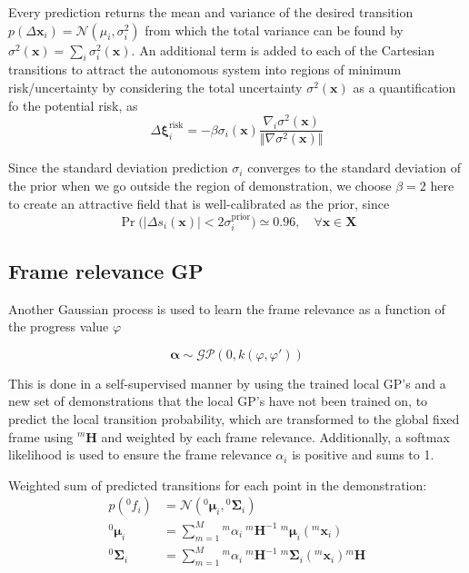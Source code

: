 Every prediction returns the mean and variance of the desired transition \( p(\Delta \boldsymbol{x}_i) = \mathcal{N}(\mu_i, \sigma_i^2) \) from which the total variance can be found by \( \sigma^2(\boldsymbol{x}) = \sum_{i} \sigma_i^2(\boldsymbol{x}) \).
An additional term is added to each of the Cartesian transitions to attract the autonomous system into regions of minimum risk/uncertainty by considering the total uncertainty \( \sigma^2(\boldsymbol{x}) \) as a quantification fo the potential risk, as
\begin{equation}
    \Delta \boldsymbol{\xi}_i^{\text{risk}} = - \beta \sigma_i(\boldsymbol{x}) \frac{\nabla_i \sigma^2(\boldsymbol{x})}{\Vert \nabla \sigma^2(\boldsymbol{x}) \Vert}
\end{equation}

Since the standard deviation prediction \( \sigma_i \) converges to the standard deviation of the prior when we go outside the region of demonstration, we choose \( \beta = 2 \) here to create an attractive field that is well-calibrated as the prior, since
\begin{equation}
    \Pr \Big( \big\vert \Delta s_i(\boldsymbol{x}) \big\vert < 2 \sigma_i^\text{prior} \Big) \simeq 0.96, \quad \forall \boldsymbol{x} \in \boldsymbol{X}
\end{equation}

\subsection{Frame relevance GP}\label{sec:frame-relevance-gp}

Another Gaussian process is used to learn the frame relevance as a function of the progress value \( \varphi \)

\begin{equation}
    \boldsymbol{\alpha} \sim \mathcal{GP}(0, k(\varphi, \varphi'))
\end{equation}

This is done in a self-supervised manner by using the trained local GP's and a new set of demonstrations that the local GP's have not been trained on, to predict the local transition probability, which are transformed to the global fixed frame using \( {}^{m}\boldsymbol{H} \) and weighted by each frame relevance.
Additionally, a softmax likelihood is used to ensure the frame relevance \( \alpha_i \) is positive and sums to 1.

Weighted sum of predicted transitions for each point in the demonstration:
\begin{align}
    p \left( {}^{0}f_i \right)
     & =
    \mathcal{N} \left( {}^{0}\boldsymbol{\mu}_i, {}^{0}\boldsymbol{\Sigma}_i \right)
    \\
    {}^{0}\boldsymbol{\mu}_i
     & =
    \sum_{m = 1}^M {}^{m}\alpha_i \ {}^{m}\boldsymbol{H}^{-1} \ {}^{m}\boldsymbol{\mu}_i \left( {}^{m}\boldsymbol{x}_i \right)
    \\
    {}^{0}\boldsymbol{\Sigma}_i
     & =
    \sum_{m = 1}^M {}^{m}\alpha_i \ {}^{m}\boldsymbol{H}^{-1} \ {}^{m}\boldsymbol{\Sigma}_i \left( {}^{m}\boldsymbol{x}_i \right) {}^{m}\boldsymbol{H}
\end{align}

